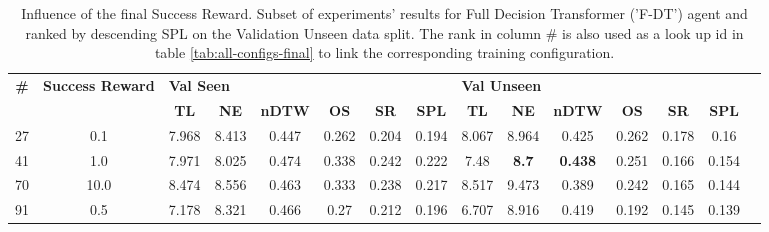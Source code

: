 \begin{table}
\centering
\caption{\label{tab:f_dt_reward_scale}Influence of the final Success Reward. Subset of experiments' results for Full Decision Transformer ('F-DT') agent and ranked by descending SPL on the Validation Unseen data split. The rank in column \# is also used as a look up id in table \ref{tab:all-configs-final} to link the corresponding training configuration.}
\begin{tabular}{@{\hskip3pt}c@{\hskip3pt}c@{\hskip3pt}c@{\hskip3pt}c@{\hskip3pt}c@{\hskip3pt}c@{\hskip3pt}c@{\hskip3pt}c@{\hskip3pt}c@{\hskip3pt}c@{\hskip3pt}c@{\hskip3pt}c@{\hskip3pt}c@{\hskip3pt}c@{\hskip3pt}c}
\toprule
\textbf{\#} & \textbf{Success Reward } & \multicolumn{6}{l}{\textbf{Val Seen}} & \multicolumn{6}{l}{\textbf{Val Unseen}} \\
 \textbf{~} &               \textbf{~} &       \textbf{TL} & \textbf{NE} & \textbf{nDTW} & \textbf{OS} & \textbf{SR} & \textbf{SPL} &         \textbf{TL} &   \textbf{NE} &   \textbf{nDTW} & \textbf{OS} & \textbf{SR} & \textbf{SPL} \\
\midrule
         27 &                      0.1 &             7.968 &       8.413 &         0.447 &       0.262 &       0.204 &        0.194 &               8.067 &         8.964 &           0.425 &       0.262 &       0.178 &         0.16 \\
         41 &                      1.0 &             7.971 &       8.025 &         0.474 &       0.338 &       0.242 &        0.222 &                7.48 &  \textbf{8.7} &  \textbf{0.438} &       0.251 &       0.166 &        0.154 \\
         70 &                     10.0 &             8.474 &       8.556 &         0.463 &       0.333 &       0.238 &        0.217 &               8.517 &         9.473 &           0.389 &       0.242 &       0.165 &        0.144 \\
         91 &                      0.5 &             7.178 &       8.321 &         0.466 &        0.27 &       0.212 &        0.196 &               6.707 &         8.916 &           0.419 &       0.192 &       0.145 &        0.139 \\
\bottomrule
\end{tabular}
\end{table}
